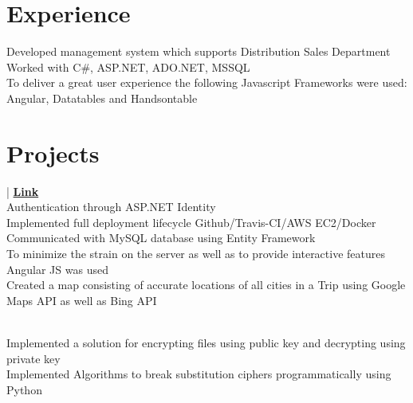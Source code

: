 \documentclass[]{Resume}
\begin{document}
\begin{minipage}[t]{0.66\textwidth} 


\section{Experience}
\textbullet{} Developed management system which supports Distribution Sales Department \\
\textbullet {} Worked with C\#, ASP.NET, ADO.NET, MSSQL \\
\textbullet{} To deliver a great user experience the following Javascript Frameworks were used:  Angular, Datatables and Handsontable \\
\sectionsep



\section{Projects}
 | \href{https://github.com/Cushionyten0/TheWorld/}{\bf Link} \\
\textbullet{} Authentication through ASP.NET Identity \\
\textbullet{} Implemented full deployment lifecycle Github/Travis-CI/AWS EC2/Docker \\
\textbullet{} Communicated with MySQL database using Entity Framework \\
\textbullet{} To minimize the strain on the server as well as to provide interactive features Angular JS was used \\
\textbullet{} Created a map consisting of accurate locations of all cities in a Trip using Google Maps API as well as Bing API

\sectionsep

 \\
\textbullet{} Implemented a solution for encrypting files using public key and decrypting using private key \\
\textbullet{} Implemented Algorithms to break substitution ciphers programmatically using Python  


\end{minipage}
\end{document}
